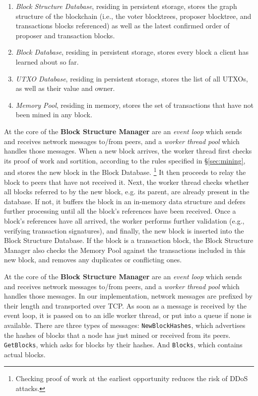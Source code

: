 \begin{enumerate}
    \item \textit{Block Structure Database}, residing in persistent storage, stores the graph structure of the blockchain (i.e., the voter blocktrees, proposer blocktree, and transactions blocks referenced) as well as the latest confirmed order of proposer and transaction blocks.
    \item \textit{Block Database}, residing in persistent storage, stores every block a client has learned about so far. 
    \item \textit{UTXO Database}, residing in persistent storage, stores the list of all UTXOs, as well as their value and owner.
    \item \textit{Memory Pool}, residing in memory, stores the set of transactions that have not been mined in any block.
\end{enumerate}



At the core of the \textbf{Block Structure Manager} are an \textit{event loop} which sends and receives network messages to/from peers, and a \textit{worker thread pool} which handles those messages. When a new block arrives, the worker thread first checks its proof of work and sortition, according to the rules specified in \S\ref{sec:mining}, and stores the new block in the Block Database.
\footnote{Checking proof of work at the earliest opportunity reduces the risk of DDoS attacks.} 
It then proceeds to relay the block to peers that have not received it. Next, the worker thread checks whether all blocks referred to by the new block, e.g. its parent, are already present in the database. If not, it buffers the block in an in-memory data structure and defers further processing until all the block's references have been received. Once a block's references have all arrived, the worker performs further validation (e.g., verifying transaction signatures), and finally, the new block is inserted into the Block Structure Database. If the block is a transaction block, the Block Structure Manager also checks the Memory Pool against the transactions included in this new block, and removes any duplicates or conflicting ones. 

At the core of the \textbf{Block Structure Manager} are an \textit{event loop} which sends and receives network messages to/from peers, and a \textit{worker thread pool} which handles those messages. In our implementation, network messages are prefixed by their length and transported over TCP. As soon as a message is received by the event loop, it is passed on to an idle worker thread, or put into a queue if none is available. There are three types of messages: \texttt{NewBlockHashes}, which advertises the hashes of blocks that a node has just mined or received from its peers. \texttt{GetBlocks}, which asks for blocks by their hashes. And \texttt{Blocks}, which contains actual blocks. 

